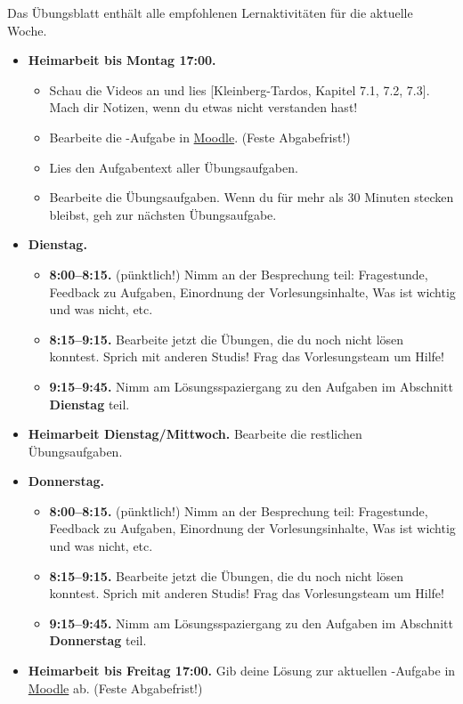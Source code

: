 \documentclass{uebung_cs}
\begin{document}
Das Übungsblatt enthält alle empfohlenen Lernaktivitäten für die aktuelle Woche.

\begin{itemize}
\item \textbf{Heimarbeit bis Montag 17:00.}
    \begin{itemize}
    \item 
    Schau die Videos an und lies [Kleinberg-Tardos, Kapitel 7.1, 7.2, 7.3]. Mach dir Notizen, wenn du etwas nicht verstanden hast!
    \item Bearbeite die -Aufgabe in \href{https://moodle.studiumdigitale.uni-frankfurt.de/moodle/course/view.php?id=2241}{Moodle}. (Feste Abgabefrist!)
    \item Lies den Aufgabentext aller Übungsaufgaben.
    \item Bearbeite die Übungsaufgaben. Wenn du für mehr als 30 Minuten stecken bleibst, geh zur nächsten Übungsaufgabe.
    \end{itemize}
\item \textbf{Dienstag.}
\begin{itemize}
    \item \textbf{8:00--8:15.} (pünktlich!) Nimm an der Besprechung teil: Fragestunde, Feedback zu Aufgaben, Einordnung der Vorlesungsinhalte, Was ist wichtig und was nicht, etc.
    \item \textbf{8:15--9:15.} Bearbeite jetzt die Übungen, die du noch nicht lösen konntest. Sprich mit anderen Studis! Frag das Vorlesungsteam um Hilfe!
    \item \textbf{9:15--9:45.} Nimm am Lösungsspaziergang zu den Aufgaben im Abschnitt \textbf{Dienstag} teil.
\end{itemize}
\item \textbf{Heimarbeit Dienstag/Mittwoch.} Bearbeite die restlichen Übungsaufgaben.
\item \textbf{Donnerstag.}
    \begin{itemize}
        \item \textbf{8:00--8:15.} (pünktlich!) Nimm an der Besprechung teil: Fragestunde, Feedback zu Aufgaben, Einordnung der Vorlesungsinhalte, Was ist wichtig und was nicht, etc.
        \item \textbf{8:15--9:15.} Bearbeite jetzt die Übungen, die du noch nicht lösen konntest. Sprich mit anderen Studis! Frag das Vorlesungsteam um Hilfe!
        \item \textbf{9:15--9:45.} Nimm am Lösungsspaziergang zu den Aufgaben im Abschnitt \textbf{Donnerstag} teil.
    \end{itemize}
\item \textbf{Heimarbeit bis Freitag 17:00.} Gib deine Lösung zur aktuellen -Aufgabe in \href{https://moodle.studiumdigitale.uni-frankfurt.de/moodle/course/view.php?id=2241}{Moodle} ab. (Feste Abgabefrist!)
\end{itemize}
\end{document}
